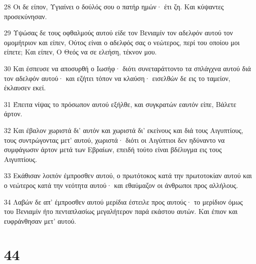 \par 28 Οι δε είπον, Υγιαίνει ο δούλός σου ο πατήρ ημών· έτι ζη. Και κύψαντες προσεκύνησαν.
\par 29 Υψώσας δε τους οφθαλμούς αυτού είδε τον Βενιαμίν τον αδελφόν αυτού τον ομομήτριον και είπεν, Ούτος είναι ο αδελφός σας ο νεώτερος, περί του οποίου μοι είπετε; Και είπεν, Ο Θεός να σε ελεήση, τέκνον μου.
\par 30 Και έσπευσε να αποσυρθή ο Ιωσήφ· διότι συνεταράττοντο τα σπλάγχνα αυτού διά τον αδελφόν αυτού· και εζήτει τόπον να κλαύση· εισελθών δε εις το ταμείον, έκλαυσεν εκεί.
\par 31 Έπειτα νίψας το πρόσωπον αυτού εξήλθε, και συγκρατών εαυτόν είπε, Βάλετε άρτον.
\par 32 Και έβαλον χωριστά δι' αυτόν και χωριστά δι' εκείνους και διά τους Αιγυπτίους, τους συντρώγοντας μετ' αυτού, χωριστά· διότι οι Αιγύπτιοι δεν ηδύναντο να συμφάγωσιν άρτον μετά των Εβραίων, επειδή τούτο είναι βδέλυγμα εις τους Αιγυπτίους.
\par 33 Εκάθισαν λοιπόν έμπροσθεν αυτού, ο πρωτότοκος κατά την πρωτοτοκίαν αυτού και ο νεώτερος κατά την νεότητα αυτού· και εθαύμαζον οι άνθρωποι προς αλλήλους.
\par 34 Λαβών δε απ' έμπροσθεν αυτού μερίδια έστειλε προς αυτούς· το μερίδιον όμως του Βενιαμίν ήτο πενταπλασίως μεγαλήτερον παρά εκάστου αυτών. Και έπιον και ευφράνθησαν μετ' αυτού.

\chapter{44}

